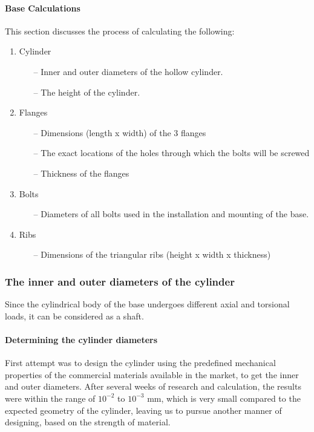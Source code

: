 \paragraph{Base Calculations}
This section discusses the process of calculating the following:
\begin{enumerate}
	\item Cylinder
	\begin{itemize}
		\item[--] Inner and outer diameters of the hollow cylinder.
		\item[--] The height of the cylinder.
	\end{itemize}

    \item Flanges
    \begin{itemize}
    	\item[--] Dimensions (length x width) of the 3 flanges
    	\item[--] The exact locations of the holes through which the bolts will be screwed
    	\item[--] Thickness of the flanges
    \end{itemize}

    \item Bolts
    \begin{itemize}
    	\item[--] Diameters of all bolts used in the installation and mounting of the base.
    \end{itemize}

    \item Ribs
    \begin{itemize}
    \item[--] Dimensions of the triangular ribs (height x width x thickness)
    \end{itemize}
\end{enumerate}

\vspace{0.5 cm}

\subsubsection{The inner and outer diameters of the cylinder}


Since the cylindrical body of the base undergoes different axial and torsional loads, it can be considered as a shaft.

\paragraph{Determining the cylinder diameters}
First attempt was to design the cylinder using the predefined mechanical properties of the commercial materials available in the market, to get the inner and outer diameters. After several weeks of research and calculation, the results were within the range of $10^{-2}$ to $10^{-3}$ mm, which is very small compared to the expected geometry of the cylinder, leaving us to pursue another manner of designing, based on the strength of material.


